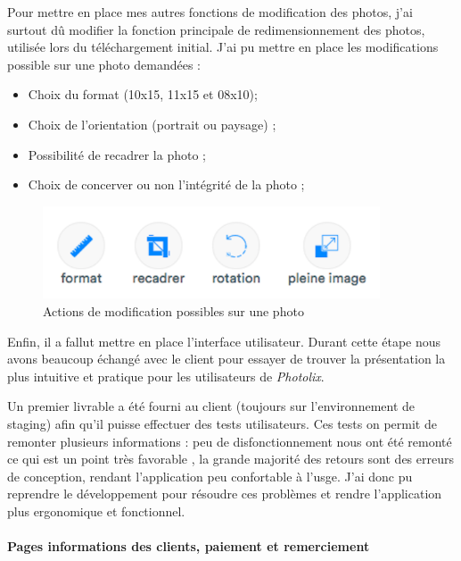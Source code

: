 \documentclass[12pt,a4paper]{article}
\providecommand{\tightlist}{%
  \setlength{\itemsep}{0pt}\setlength{\parskip}{0pt}}
\begin{document}
  \bigskip

  Pour mettre en place mes autres fonctions de modification des photos,
  j'ai surtout dû modifier la fonction principale de redimensionnement des
  photos, utilisée lors du téléchargement initial. J'ai pu mettre en place
  les modifications possible sur une photo demandées :

  \begin{itemize}
  \tightlist
  \item
    Choix du format (10x15, 11x15 et 08x10);
  \item
    Choix de l'orientation (portrait ou paysage) ;
  \item
    Possibilité de recadrer la photo ;
  \item
    Choix de concerver ou non l'intégrité de la photo ;
  \end{itemize}

  \begin{figure}[h]
    \centering
    \includegraphics[width=10cm]{figures/photolix-1.png}
    \caption{Actions de modification possibles sur une photo}
  \end{figure}

  \bigskip

  Enfin, il a fallut mettre en place l'interface utilisateur. Durant cette
  étape nous avons beaucoup échangé avec le client pour essayer de trouver
  la présentation la plus intuitive et pratique pour les utilisateurs de
  \emph{Photolix}.

  Un premier livrable a été fourni au client (toujours sur l'environnement
  de staging) afin qu'il puisse effectuer des tests utilisateurs. Ces
  tests on permit de remonter plusieurs informations : peu de
  disfonctionnement nous ont été remonté ce qui est un point très
  favorable , la grande majorité des retours sont des erreurs de
  conception, rendant l'application peu confortable à l'usge. J'ai donc pu
  reprendre le développement pour résoudre ces problèmes et rendre
  l'application plus ergonomique et fonctionnel.

  \paragraph{Pages informations des clients, paiement et
  remerciement}\label{pages-informations-des-clients-paiement-et-remerciement}
\end{document}
